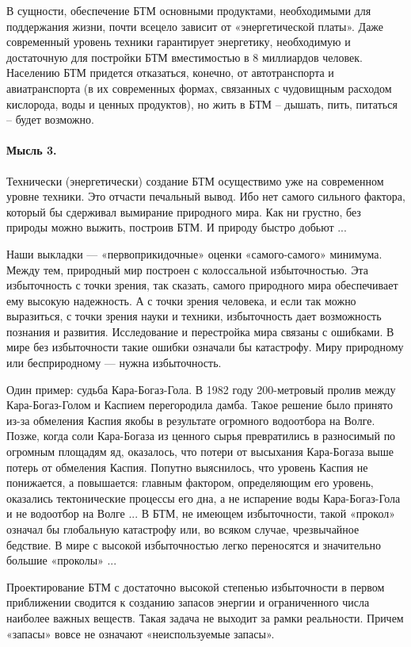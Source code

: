 \documentclass[11pt,a4paper]{article}
\begin{document}
В сущности, обеспечение БТМ основными продуктами, необходимыми для поддержания
жизни, почти всецело зависит от «энергетической платы». Даже современный
уровень техники гарантирует энергетику, необходимую и достаточную для
постройки БТМ вместимостью в 8 миллиардов человек. Населению БТМ придется
отказаться, конечно, от автотранспорта и авиатранспорта (в их современных
формах, связанных с чудовищным расходом кислорода, воды и ценных продуктов),
но жить в БТМ -- дышать, пить, питаться -- будет возможно.

\paragraph{Мысль 3.}
Технически (энергетически) создание БТМ осуществимо уже на современном уровне
техники. Это отчасти печальный вывод. Ибо нет самого сильного фактора, который
бы сдерживал вымирание природного мира. Как ни грустно, без природы можно
выжить, построив БТМ. И природу быстро добьют ...

Наши выкладки — «первоприкидочные» оценки «самого-самого» минимума. Между тем,
природный мир построен с колоссальной избыточностью. Эта избыточность с точки
зрения, так сказать, самого природного мира обеспечивает ему высокую
надежность. А с точки зрения человека, и если так можно выразиться, с точки
зрения науки и техники, избыточность дает возможность познания и развития.
Исследование и перестройка мира связаны с ошибками. В мире без избыточности
такие ошибки означали бы катастрофу. Миру природному или бесприродному — нужна
избыточность.

Один пример: судьба Кара-Богаз-Гола.  В 1982 году 200-метровый пролив между
Кара-Богаз-Голом и Каспием перегородила дамба. Такое решение было принято
из-за обмеления Каспия якобы в результате огромного водоотбора на Волге.
Позже, когда соли Кара-Богаза из ценного сырья превратились в разносимый по
огромным площадям яд, оказалось, что потери от высыхания Кара-Богаза выше
потерь от обмеления Каспия.  Попутно выяснилось, что уровень Каспия не
понижается, а повышается: главным фактором, определяющим его уровень,
оказались тектонические процессы его дна, а не испарение воды Кара-Богаз-Гола
и не водоотбор на Волге ... В БТМ, не имеющем избыточности, такой «прокол»
означал бы глобальную катастрофу или, во всяком случае, чрезвычайное бедствие.
В мире с высокой избыточностью легко переносятся и значительно большие
«проколы» ...

Проектирование БТМ с достаточно высокой степенью избыточности в первом
приближении сводится к созданию запасов энергии и ограниченного числа наиболее
важных веществ. Такая задача не выходит за рамки реальности. Причем «запасы»
вовсе не означают «неиспользуемые запасы».
\end{document}
